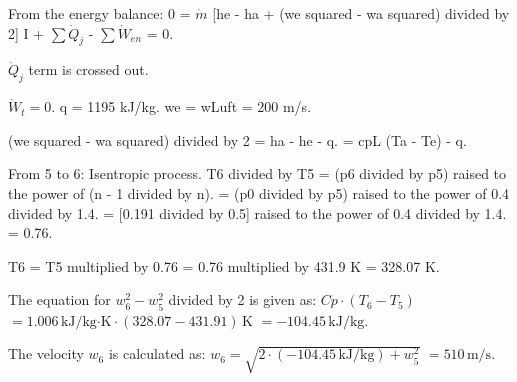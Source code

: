 From the energy balance:  
0 = \( \dot{m} \) [he - ha + (we squared - wa squared) divided by 2] I + \( \sum \dot{Q}_j \) - \( \sum \dot{W}_{en} \) = 0.  

\( \dot{Q}_j \) term is crossed out.  

\( \dot{W}_t = 0 \).  
q = 1195 kJ/kg.  
we = wLuft = 200 m/s.  

(we squared - wa squared) divided by 2 = ha - he - q.  
= cpL (Ta - Te) - q.  

From 5 to 6: Isentropic process.  
T6 divided by T5 = (p6 divided by p5) raised to the power of (n - 1 divided by n).  
= (p0 divided by p5) raised to the power of 0.4 divided by 1.4.  
= [0.191 divided by 0.5] raised to the power of 0.4 divided by 1.4.  
= 0.76.  

T6 = T5 multiplied by 0.76 = 0.76 multiplied by 431.9 K = 328.07 K.

The equation for \( w_6^2 - w_5^2 \) divided by 2 is given as:  
\( Cp \cdot (T_6 - T_5) \)  
\( = 1.006 \, \text{kJ/kg·K} \cdot (328.07 - 431.91) \, \text{K} \)  
\( = -104.45 \, \text{kJ/kg} \).  

The velocity \( w_6 \) is calculated as:  
\( w_6 = \sqrt{2 \cdot (-104.45 \, \text{kJ/kg}) + w_5^2} \)  
\( = 510 \, \text{m/s} \).